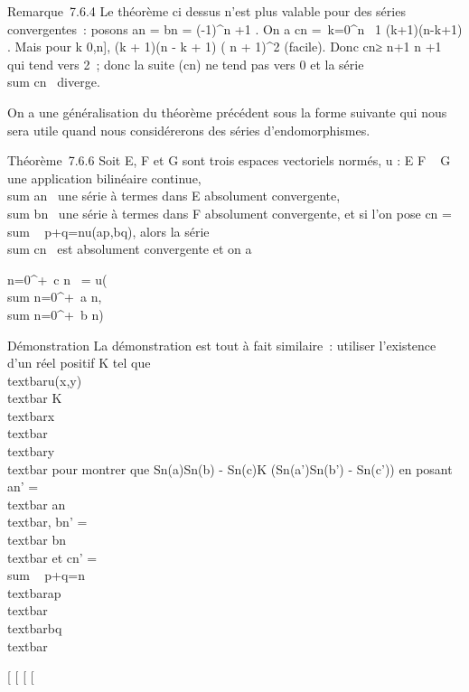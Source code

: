 Remarque~7.6.4 Le théorème ci dessus n'est plus valable pour des séries
convergentes~: posons an = bn = (-1)^n
\over \sqrtn+1 . On a
\textbar{}cn\textbar{} =\
\sum  k=0^n~ 1
\over \sqrt(k+1)(n-k+1) . Mais pour
k \in {[}0,n{]}, (k + 1)(n - k + 1) \leq ( n  +
1)^2 (facile). Donc \textbar{}cn\textbar{}≥ n+1
\over  n \over 2 +1 qui tend vers
2~; donc la suite (cn) ne tend pas vers 0 et la série
\\sum  cn~
diverge.

On a une généralisation du théorème précédent sous la forme suivante qui
nous sera utile quand nous considérerons des séries d'endomorphismes.

Théorème~7.6.6 Soit E, F et G sont trois espaces vectoriels normés, u :
E \times F \rightarrow~ G une application bilinéaire continue,
\\sum  an~ une
série à termes dans E absolument convergente,
\\sum  bn~ une
série à termes dans F absolument convergente, et si l'on pose
cn = \\sum ~
p+q=nu(ap,bq), alors la série
\\sum  cn~ est
absolument convergente et on a

\sum n=0^+\infty~c n~ =
u\left (\\sum
n=0^+\infty~a n,\\sum
n=0^+\infty~b n\right )

Démonstration La démonstration est tout à fait similaire~: utiliser
l'existence d'un réel positif K tel que
\\textbar{}u(x,y)\\textbar{} \leq
K\\textbar{}x\\textbar{}
\\textbar{}y\\textbar{} pour montrer que
\left \textbar{}Sn(a)Sn(b) -
Sn(c)\right \textbar{}\leq K\left
(Sn(a')Sn(b') -
Sn(c')\right ) en posant an'
=\\textbar{} an\\textbar{},
bn' =\\textbar{}
bn\\textbar{} et cn'
= \\sum ~
p+q=n\\textbar{}ap\\textbar{}\\textbar{}bq\\textbar{}

{[}
{[}
{[}
{[}
